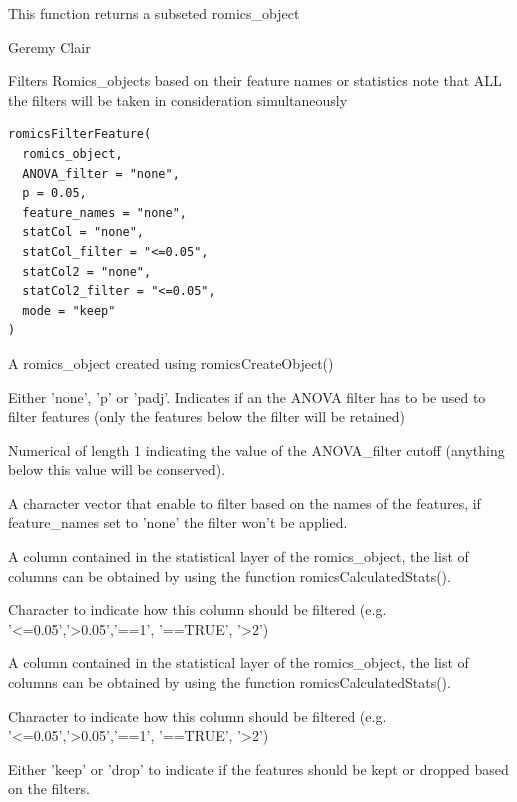 \documentclass[a4paper]{book}
\begin{document}
%
\begin{Value}
This function returns a subseted romics\_object
\end{Value}
%
\begin{Author}
Geremy Clair
\end{Author}
%
\begin{Description}
Filters Romics\_objects based on their feature names or statistics note that ALL the filters will be taken in consideration simultaneously
\end{Description}
%
\begin{Usage}
\begin{verbatim}
romicsFilterFeature(
  romics_object,
  ANOVA_filter = "none",
  p = 0.05,
  feature_names = "none",
  statCol = "none",
  statCol_filter = "<=0.05",
  statCol2 = "none",
  statCol2_filter = "<=0.05",
  mode = "keep"
)
\end{verbatim}
\end{Usage}
%
\begin{Arguments}
\begin{ldescription}
\item[\code{romics\_object}] A romics\_object created using romicsCreateObject()

\item[\code{ANOVA\_filter}] Either 'none', 'p' or 'padj'. Indicates if an the ANOVA filter has to be used to filter features (only the features below the filter will be retained)

\item[\code{p}] Numerical of length 1 indicating the value of the ANOVA\_filter cutoff (anything below this value will be conserved).

\item[\code{feature\_names}] A character vector that enable to filter based on the names of the features, if feature\_names set to 'none' the filter won't be applied.

\item[\code{statCol}] A column contained in the statistical layer of the romics\_object, the list of columns can be obtained by using the function romicsCalculatedStats().

\item[\code{statCol\_filter}] Character to indicate how this column should be filtered (e.g. '<=0.05','>0.05','==1', '==TRUE', '>2')

\item[\code{statCol2}] A column contained in the statistical layer of the romics\_object, the list of columns can be obtained by using the function romicsCalculatedStats().

\item[\code{statCol2\_filter}] Character to indicate how this column should be filtered (e.g. '<=0.05','>0.05','==1', '==TRUE', '>2')

\item[\code{mode}] Either 'keep' or 'drop' to indicate if the features should be kept or dropped based on the filters.
\end{ldescription}
\end{Arguments}
\end{document}
